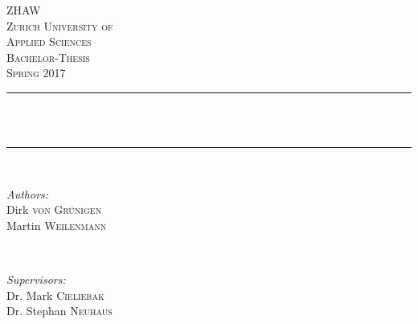 \begin{titlepage}
	
	\newcommand{\HRule}{\rule{\linewidth}{0.5mm}} %
	
	\center %
	
	
	\textsc{\LARGE ZHAW}\\ %
	\textsc{\Large Zurich University of\\Applied Sciences}\\[1.0cm]
	\textsc{\Large Bachelor-Thesis}\\[0.5cm] %
	\textsc{\large Spring 2017}\\[0.5cm] %
	
	
	\HRule \\[0.4cm]
	{ \LARGE \bfseries \mytitle}\\[0.4cm] %
	\HRule \\[1.5cm]
	
	
	\begin{minipage}{0.4\textwidth}
		\begin{flushleft} \large
			\emph{Authors:}\\
			Dirk \textsc{von Grünigen}\\
			Martin \textsc{Weilenmann}
		\end{flushleft}
	\end{minipage}
	~
	\begin{minipage}{0.4\textwidth}
		\begin{flushright} \large
			\emph{Supervisors:} \\
			Dr. Mark \textsc{Cieliebak}\\
			Dr. Stephan \textsc{Neuhaus}
		\end{flushright}
	\end{minipage}\\[2cm]
	

\end{titlepage}
